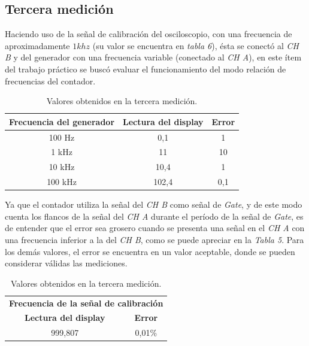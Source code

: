 \documentclass{article}
\begin{document}
\subsection{Tercera medición}
\medskip

Haciendo uso de la señal de calibración del osciloscopio, con una frecuencia de aproximadamente $1 khz$ (su valor se encuentra en \textit{tabla 6}), ésta se conectó al \textit{CH B} y del generador con una frecuencia variable (conectado al \textit{CH A}), en este ítem del trabajo práctico se buscó evaluar el funcionamiento del modo relación de frecuencias del contador.
\bigskip


\begin{table}[!hbt]
	\begin{center}
		\begin{tabular}{|c|c|c|} \hline
			\textbf{Frecuencia del generador} & \textbf{Lectura del display} & \textbf{Error} \\\hline
			100 Hz & 0,1 & 1 \\\hline
			1 kHz & 11 & 10 \\\hline
			10 kHz & 10,4 & 1 \\\hline
			100 kHz & 102,4 & 0,1 \\\hline
		\end{tabular}

	\caption{Valores obtenidos en la tercera medición.}
	\end{center}
\end{table}
\medskip


	Ya que el contador utiliza la señal del \textit{CH B} como señal de \textit{Gate}, y de este modo cuenta los flancos de la señal del \textit{CH A} durante el período  de la señal de \textit{Gate}, es de entender que el error sea grosero cuando se presenta una señal en el \textit{CH A} con una frecuencia inferior a la del \textit{CH B}, como se puede apreciar en la \textit{Tabla 5}. Para los demás valores, el error se encuentra en un valor aceptable, donde se pueden considerar válidas las mediciones.
\bigskip


\begin{table}[!hbt]
	\begin{center}
		\begin{tabular}{|c|c|} \hline
			\multicolumn{2}{|c|}{\textbf{Frecuencia de la señal de calibración}} \\\cline{1-2}
			\textbf{Lectura del display} & \textbf{Error} \\\hline
			999,807 & 0,01\%\\\hline
		\end{tabular}

	\caption{Valores obtenidos en la tercera medición.}
	\end{center}
\end{table}
\medskip
\end{document}
